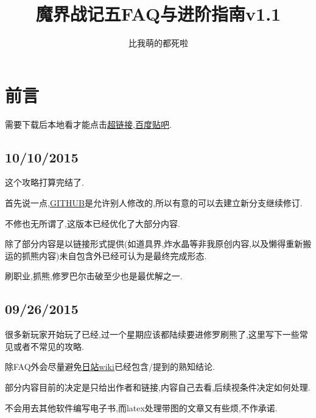 




\title{魔界战记五FAQ与进阶指南v1.1}
\author{比我萌的都死啦}

\maketitle

\newpage

\section{前言}

需要下载后本地看才能点击\href{https://github.com/KindleIsNotKind/Disgaea_5_How_To}{超链接},\href{http://tieba.baidu.com/f?kw=%E9%AD%94%E7%95%8C%E6%88%98%E8%AE%B0&ie=utf-8}{百度贴吧}.

\subsection{10/10/2015}


这个攻略打算完结了.

首先说一点,\href{https://github.com/KindleIsNotKind/Disgaea_5_How_To}{GITHUB}是允许别人修改的,所以有意的可以去建立新分支继续修订.

不修也无所谓了,这版本已经优化了大部分内容.

除了部分内容是以链接形式提供(如道具界,炸水晶等非我原创内容,以及懒得重新搬运的抓熊内容)未自包含外已经可认为是最终完成形态.

刷职业,抓熊,修罗巴尔击破至少也是最优解之一.

\subsection{09/26/2015}

很多新玩家开始玩了已经,过一个星期应该都陆续要进修罗刷熊了,这里写下一些常见或者不常见的攻略.

{\color{red}{本文建立在有魔女DLC和暴君DLC的基础之上,几十块钱和几十小时时间自己选.}}

除FAQ外会尽量避免\href{http://wikinavi.net/disgaea5/index.php}{日站wiki}已经包含/提到的熟知结论.

部分内容目前的决定是只给出作者和链接,内容自己去看,后续视条件决定如何处理.

不会用去其他软件编写电子书,而latex处理带图的文章又有些烦,不作承诺.

